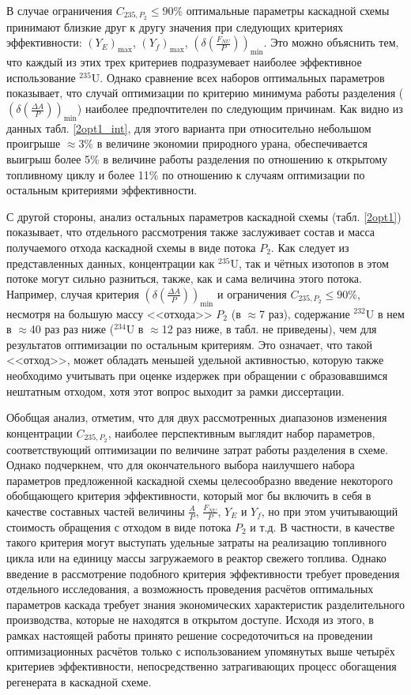 В случае ограничения $C_{235,{P_2}} \leq 90\%$ оптимальные параметры каскадной схемы принимают близкие друг к другу значения при следующих критериях эффективности: $(Y_{E})_\text{max}$, $(Y_f)_\text{max}$, $(\delta(\frac{F_{NU}}{P}))_\text{min}$. Это можно объяснить тем, что каждый из этих трех критериев подразумевает наиболее эффективное использование $^{235}$U. Однако сравнение всех наборов оптимальных параметров показывает, что случай оптимизации по критерию минимума работы разделения ($(\delta(\frac{\Delta A}{P}))_\text{min}$) наиболее предпочтителен по следующим причинам. Как видно из данных табл. \ref{2opt1_int}, для этого варианта при относительно небольшом проигрыше $\approx$3\% в величине экономии природного урана, обеспечивается выигрыш более 5\% в величине работы разделения по отношению к открытому топливному циклу и более 11\% по отношению к случаям оптимизации по остальным критериями эффективности.

С другой стороны, анализ остальных параметров каскадной схемы (табл. \ref{2opt1}) показывает, что отдельного рассмотрения также заслуживает состав и масса получаемого отхода каскадной схемы в виде потока $P_2$. Как следует из представленных данных, концентрации как $^{235}$U, так и чётных изотопов в этом потоке могут сильно разниться, также, как и сама величина этого потока. Например, случая критерия $(\delta(\frac{\Delta A}{P}))_\text{min}$ и ограничения $C_{235,{P_2}} \leq 90\%$, несмотря на большую массу <<отхода>> $P_{2}$ (в $\approx$7 раз), содержание $^{232}$U в нем в $\approx$40 раз раз ниже ($^{234}$U в $\approx$12 раз ниже, в табл. не приведены), чем для результатов оптимизации по остальным критериям. Это означает, что такой <<отход>>, может обладать меньшей удельной активностью, которую также необходимо учитывать при оценке издержек при обращении с образовавшимся нештатным отходом, хотя этот вопрос выходит за рамки диссертации. 

Обобщая анализ, отметим, что для двух рассмотренных диапазонов изменения концентрации $C_{235,{P_2}}$, наиболее перспективным выглядит набор параметров, соответствующий оптимизации по величине затрат работы разделения в схеме. Однако подчеркнем, что для окончательного выбора наилучшего набора параметров предложенной каскадной схемы целесообразно введение некоторого обобщающего критерия эффективности, который мог бы включить в себя в качестве составных частей величины $\frac{A}{P}$, $\frac{F_{NU}}{P}$, $Y_E$ и $Y_f$, но при этом учитывающий стоимость обращения с отходом в виде потока $P_2$ и т.д. В частности, в качестве такого критерия могут выступать удельные затраты на реализацию топливного цикла или на единицу массы загружаемого в реактор свежего топлива. Однако введение в рассмотрение подобного критерия эффективности требует проведения отдельного исследования, а возможность проведения расчётов оптимальных параметров каскада требует знания экономических характеристик разделительного производства, которые не находятся в открытом доступе. Исходя из этого, в рамках настоящей работы принято решение сосредоточиться на проведении оптимизационных расчётов только с использованием упомянутых выше четырёх критериев эффективности, непосредственно затрагивающих процесс обогащения регенерата в каскадной схеме.

